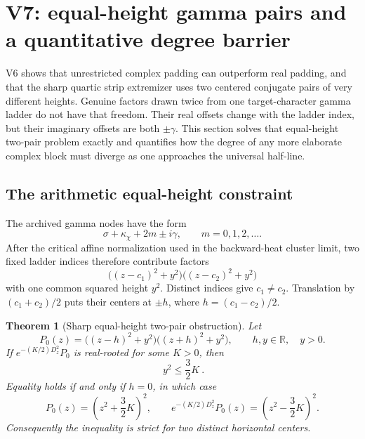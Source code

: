 \documentclass[11pt]{article}
\newtheorem{theorem}{Theorem}[section]
\theoremstyle{definition}
\theoremstyle{remark}
\begin{document}



\section{V7: equal-height gamma pairs and a quantitative degree barrier}
\label{sec:grh-v7}

V6 shows that unrestricted complex padding can outperform real padding, and
that the sharp quartic strip extremizer uses two centered conjugate pairs of
very different heights.  Genuine factors drawn twice from one
target-character gamma ladder do not have that freedom.  Their real offsets
change with the ladder index, but their imaginary offsets are both
\(\pm\gamma\).  This section solves that equal-height two-pair problem
exactly and quantifies how the degree of any more elaborate complex block
must diverge as one approaches the universal half-line.

\subsection{The arithmetic equal-height constraint}

The archived gamma nodes have the form
\[
 \sigma+\kappa_\chi+2m\pm i\gamma,
 \qquad m=0,1,2,\ldots.
 \tag{N7.1}
\]
After the critical affine normalization used in the backward-heat cluster
limit, two fixed ladder indices therefore contribute factors
\[
 \bigl((z-c_1)^2+y^2\bigr)
 \bigl((z-c_2)^2+y^2\bigr)
 \tag{N7.2}
\]
with one common squared height \(y^2\).  Distinct indices give
\(c_1\ne c_2\).  Translation by \((c_1+c_2)/2\) puts their centers at
\(\pm h\), where \(h=(c_1-c_2)/2\).

\begin{theorem}[Sharp equal-height two-pair obstruction]
\label{thm:f2v7-equal-pairs}
Let
\[
 P_0(z)=\bigl((z-h)^2+y^2\bigr)
         \bigl((z+h)^2+y^2\bigr),
 \qquad h,y\in\mathbb R,\quad y>0.
 \tag{N7.3}
\]
If \(e^{-(K/2)D_z^2}P_0\) is real-rooted for some \(K>0\), then
\[
 \boxed{\ y^2\le\frac32K\ }.
 \tag{N7.4}
\]
Equality holds if and only if \(h=0\), in which case
\[
 P_0(z)=\left(z^2+\frac32K\right)^2,
 \qquad
 e^{-(K/2)D_z^2}P_0(z)
 =\left(z^2-\frac32K\right)^2.
 \tag{N7.5}
\]
Consequently the inequality is strict for two distinct horizontal centers.
\end{theorem}
\end{document}
